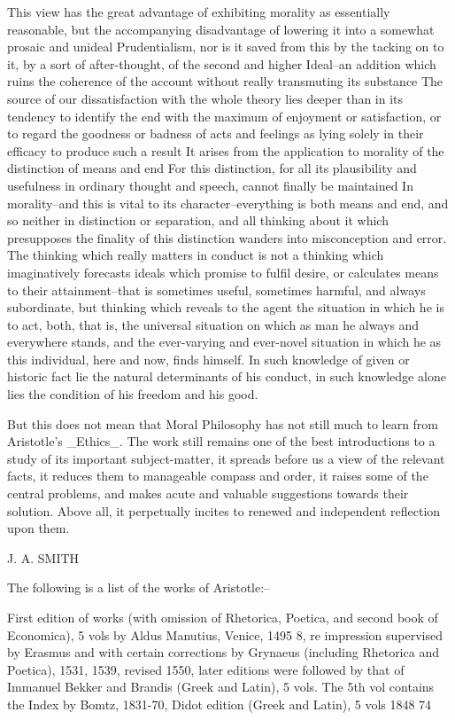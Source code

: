 This view has the great advantage of exhibiting morality as essentially
reasonable, but the accompanying disadvantage of lowering it into a
somewhat prosaic and unideal Prudentialism, nor is it saved from this
by the tacking on to it, by a sort of after-thought, of the second and
higher Ideal--an addition which ruins the coherence of the account
without really transmuting its substance The source of our
dissatisfaction with the whole theory lies deeper than in its tendency
to identify the end with the maximum of enjoyment or satisfaction, or to
regard the goodness or badness of acts and feelings as lying solely in
their efficacy to produce such a result It arises from the application
to morality of the distinction of means and end For this distinction,
for all its plausibility and usefulness in ordinary thought and speech,
cannot finally be maintained In morality--and this is vital to its
character--everything is both means and end, and so neither in
distinction or separation, and all thinking about it which presupposes
the finality of this distinction wanders into misconception and error.
The thinking which really matters in conduct is not a thinking which
imaginatively forecasts ideals which promise to fulfil desire, or
calculates means to their attainment--that is sometimes useful,
sometimes harmful, and always subordinate, but thinking which reveals
to the agent the situation in which he is to act, both, that is, the
universal situation on which as man he always and everywhere stands,
and the ever-varying and ever-novel situation in which he as this
individual, here and now, finds himself. In such knowledge of given
or historic fact lie the natural determinants of his conduct, in such
knowledge alone lies the condition of his freedom and his good.

But this does not mean that Moral Philosophy has not still much to
learn from Aristotle's _Ethics_. The work still remains one of the best
introductions to a study of its important subject-matter, it spreads
before us a view of the relevant facts, it reduces them to manageable
compass and order, it raises some of the central problems, and makes
acute and valuable suggestions towards their solution. Above all, it
perpetually incites to renewed and independent reflection upon them.

J. A. SMITH


  The following is a list of the works of Aristotle:--

  First edition of works (with omission of Rhetorica, Poetica, and
  second book of Economica), 5 vols by Aldus Manutius, Venice, 1495 8,
  re impression supervised by Erasmus and with certain corrections by
  Grynaeus (including Rhetorica and Poetica), 1531, 1539, revised 1550,
  later editions were followed by that of Immanuel Bekker and Brandis
  (Greek and Latin), 5 vols. The 5th vol contains the Index by Bomtz,
  1831-70, Didot edition (Greek and Latin), 5 vols 1848 74

